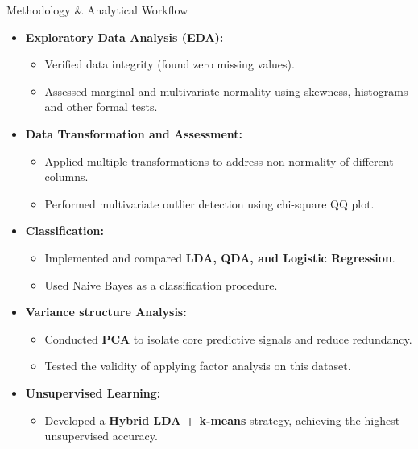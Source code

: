 \documentclass[8pt, aspectratio=169]{beamer}
\begin{document}
\begin{frame}{Methodology \& Analytical Workflow}
    \begin{itemize}
        \item \textbf{Exploratory Data Analysis (EDA):}
        \begin{itemize}
            \item Verified data integrity (found zero missing values).
            \item Assessed marginal and multivariate normality using skewness, histograms and other formal tests.
      
        \end{itemize}
        
        \item \textbf{Data Transformation and Assessment:}
        \begin{itemize}
            \item Applied multiple transformations to address non-normality of different columns.
            \item Performed multivariate outlier detection using chi-square QQ plot.
        \end{itemize}
        
        \item \textbf{ Classification:}
        \begin{itemize}
            \item Implemented and compared \textbf{LDA, QDA, and Logistic Regression}.
            \item Used Naive Bayes as a classification procedure.
        \end{itemize}
        
        \item \textbf{Variance structure Analysis:}
        \begin{itemize}
            \item Conducted \textbf{PCA} to isolate core predictive signals and reduce redundancy.
            \item Tested the validity of applying factor analysis on this dataset.
        \end{itemize}
        
        \item \textbf{Unsupervised Learning:}
        \begin{itemize}
            \item Developed a \textbf{Hybrid LDA + k-means} strategy, achieving the highest unsupervised accuracy.
        \end{itemize}
    \end{itemize}
\end{frame}
\end{document}
